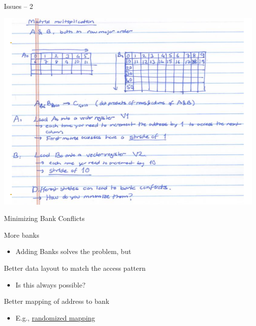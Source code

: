 \documentclass[presentation]{beamer}
\begin{document}
\begin{frame}[label={sec:orgf5a4537},plain]{Issues -- 2}
\begin{center}
\includegraphics[width=.9\linewidth]{./images/slides_SIMD_48.png}
\end{center}
\end{frame}


\begin{frame}[label={sec:org0bbbed8}]{Minimizing Bank Conflicts}
\begin{block}{More banks}
\begin{itemize}
\item Adding Banks solves the problem, but \faDollar{}
\end{itemize}
\pause
\end{block}
\begin{block}{Better data layout to match the access pattern}
\begin{itemize}
\item Is this always possible?
\end{itemize}
\pause
\end{block}
\begin{block}{Better mapping of address to bank}
\begin{itemize}
\item E.g., \href{https://people.eecs.berkeley.edu/\~kubitron/courses/cs252-S12/handouts/papers/p74-rau.pdf}{randomized mapping}
\end{itemize}
\end{block}
\end{frame}
\end{document}
